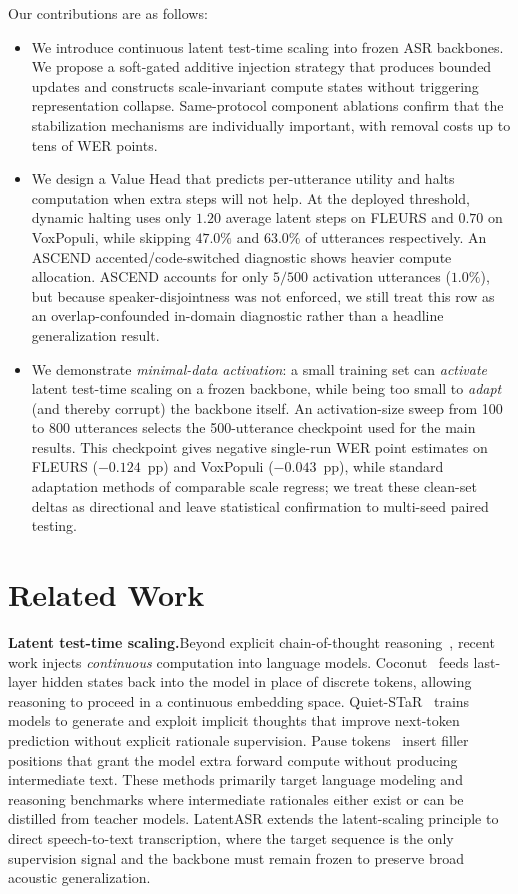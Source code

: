 \documentclass[a4paper]{article}
\newcommand{\method}{LatentASR}
\begin{document}
Our contributions are as follows:
\begin{itemize}
    \item We introduce continuous latent test-time scaling into frozen ASR backbones. We propose a soft-gated additive injection strategy that produces bounded updates and constructs scale-invariant compute states without triggering representation collapse. Same-protocol component ablations confirm that the stabilization mechanisms are individually important, with removal costs up to tens of WER points.
    \item We design a Value Head that predicts per-utterance utility and halts computation when extra steps will not help. At the deployed threshold, dynamic halting uses only $1.20$ average latent steps on FLEURS and $0.70$ on VoxPopuli, while skipping $47.0\%$ and $63.0\%$ of utterances respectively. An ASCEND accented/code-switched diagnostic shows heavier compute allocation. ASCEND accounts for only $5/500$ activation utterances ($1.0\%$), but because speaker-disjointness was not enforced, we still treat this row as an overlap-confounded in-domain diagnostic rather than a headline generalization result.
    \item We demonstrate \emph{minimal-data activation}: a small training set can \emph{activate} latent test-time scaling on a frozen backbone, while being too small to \emph{adapt} (and thereby corrupt) the backbone itself. An activation-size sweep from 100 to 800 utterances selects the 500-utterance checkpoint used for the main results. This checkpoint gives negative single-run WER point estimates on FLEURS ($-0.124$~pp) and VoxPopuli ($-0.043$~pp), while standard adaptation methods of comparable scale regress; we treat these clean-set deltas as directional and leave statistical confirmation to multi-seed paired testing.
\end{itemize}

\section{Related Work}
\label{sec:related}

\textbf{Latent test-time scaling.}\quad Beyond explicit chain-of-thought reasoning~\cite{wei2022chain}, recent work injects \emph{continuous} computation into language models. Coconut~\cite{hao2024training} feeds last-layer hidden states back into the model in place of discrete tokens, allowing reasoning to proceed in a continuous embedding space. Quiet-STaR~\cite{zelikman2024quiet} trains models to generate and exploit implicit thoughts that improve next-token prediction without explicit rationale supervision. Pause tokens~\cite{goyal2024think} insert filler positions that grant the model extra forward compute without producing intermediate text. These methods primarily target language modeling and reasoning benchmarks where intermediate rationales either exist or can be distilled from teacher models. \method{} extends the latent-scaling principle to direct speech-to-text transcription, where the target sequence is the only supervision signal and the backbone must remain frozen to preserve broad acoustic generalization.
\end{document}
